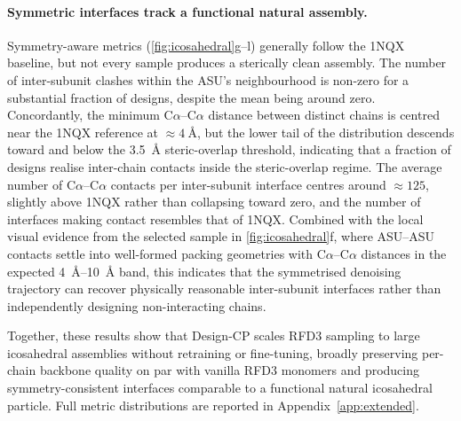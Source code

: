 \paragraph{Symmetric interfaces track a functional natural assembly.}
Symmetry-aware metrics (\cref{fig:icosahedral}g--l) generally follow the
1NQX baseline, but not every sample produces a sterically clean assembly. The
number of inter-subunit clashes within the ASU's neighbourhood is non-zero for a
substantial fraction of designs, despite the mean being around zero.
Concordantly, the minimum C$\alpha$--C$\alpha$ distance between distinct chains is
centred near the 1NQX reference at $\approx \SI{4}{\angstrom}$, but the lower tail
of the distribution descends toward and below the \SI{3.5}{\angstrom}
steric-overlap threshold, indicating that a fraction of designs realise inter-chain
contacts inside the steric-overlap regime. The average number of
C$\alpha$--C$\alpha$ contacts per inter-subunit interface centres around
$\approx 125$, slightly above 1NQX rather than collapsing toward zero, and the
number of interfaces making contact resembles that of 1NQX. Combined with the
local visual evidence from the selected sample in
\cref{fig:icosahedral}f, where ASU--ASU contacts settle into well-formed
packing geometries with C$\alpha$--C$\alpha$ distances in the expected
\SIrange{4}{10}{\angstrom} band, this indicates that the symmetrised denoising
trajectory can recover physically reasonable inter-subunit interfaces rather than
independently designing non-interacting chains.

Together, these results show that Design-CP scales RFD3 sampling to large
icosahedral assemblies without retraining or fine-tuning, broadly preserving
per-chain backbone quality on par with vanilla RFD3 monomers and producing
symmetry-consistent interfaces comparable to a functional natural icosahedral
particle. Full metric distributions are reported in
Appendix~\ref{app:extended}.


